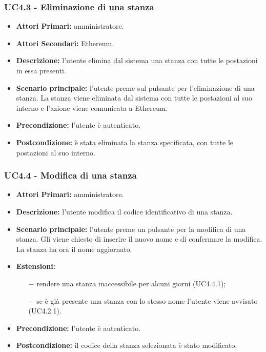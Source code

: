 \subsubsection{ UC4.3 - Eliminazione di una stanza}
\begin{itemize}
	\item\textbf{Attori Primari:}
	amministratore.
	\item\textbf{Attori Secondari:}
	Ethereum.
	\item\textbf{Descrizione:} 
	l'utente elimina dal sistema una stanza con tutte le postazioni in essa presenti.
	\item\textbf{Scenario principale:} 
	l'utente preme sul pulsante per l'eliminazione di una stanza. La stanza viene eliminata dal sistema con tutte le postazioni al suo interno e l'azione viene comunicata a Ethereum.
	\item\textbf{Precondizione:} 
	l'utente è autenticato.
	\item\textbf{Postcondizione:}
	è stata eliminata la stanza specificata, con tutte le postazioni al suo interno.
\end{itemize}

\subsubsection{UC4.4 - Modifica di una stanza}
\begin{itemize}
	\item\textbf{Attori Primari:}
	amministratore.
	\item\textbf{Descrizione:}
	l'utente modifica il codice identificativo di una stanza.
	\item\textbf{Scenario principale:} 
	l'utente preme un pulsante per la modifica di una stanza. Gli viene chiesto di inserire il nuovo nome e di confermare la modifica. La stanza ha ora il nome aggiornato.
	\item\textbf{Estensioni:}
	\begin{itemize}
		\item[$-$] rendere una stanza inaccessibile per alcuni giorni (UC4.4.1);
		\item[$-$] se è già presente una stanza con lo stesso nome l'utente viene avvisato (UC4.2.1).
	\end{itemize}
	\item\textbf{Precondizione:} 
	l'utente è autenticato.
	\item\textbf{Postcondizione:}
	il codice della stanza selezionata è stato modificato.
\end{itemize}

